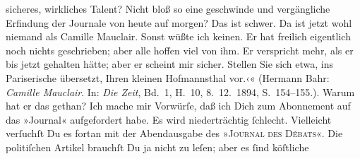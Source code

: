 \begin{ledgroupsized}[t]{13cm}
{{{                     sicheres, wirkliches Talent? Nicht bloß so eine geschwinde und vergängliche
                     Erfindung der Journale von heute auf morgen? Das ist schwer. Da ist jetzt wohl
                     niemand als Camille Mauclair. Sonst wüßte
                     ich keinen. Er hat freilich eigentlich noch nichts geschrieben; aber alle
                     hoffen viel von ihm. Er verspricht mehr, als er bis jetzt gehalten hätte; aber
                     er scheint mir sicher. Stellen Sie sich etwa, ins Pariserische übersetzt, Ihren kleinen Hofmannsthal vor.‹« (Hermann Bahr: \emph{Camille Mauclair}. In: \emph{Die Zeit}, Bd. 1, H. 10, 8. 12. 1894,
                  S. 154–155.)}}}\label{K_mets_Goldmann_94-partII-77h}. Warum hat er das gethan?\pend
           \pstart
           Ich mache mir Vorwürſe, daß ich Dich zum Abonnement auf das {\pb}»Journal« aufgefordert habe. Es wird niederträchtig ſchlecht. Vielleicht
               verſuchſt Du es fortan mit der Abendausgabe des »\textsc{Journal des Débats}«. Die politiſchen Artikel brauchſt Du ja nicht zu leſen; aber es ſind köſtliche

\end{ledgroupsized}
